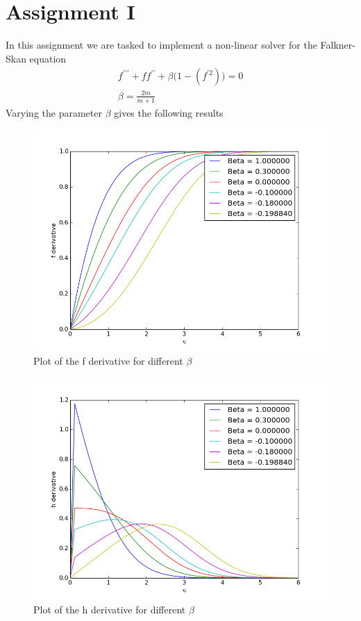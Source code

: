 \documentclass[a4paper,norsk]{article}
\begin{document}
\maketitle
\section*{Assignment I}
In this assignment we are tasked to implement a non-linear solver for the Falkner-Skan equation
\begin{align*}
f^{\prime\prime\prime} + ff^{\prime\prime} + \beta\Big(1-(f^{\prime2})\Big) = 0 \\
\beta = \frac{2m}{m+1}
\end{align*}
Varying the parameter $\beta$ gives the following results

\begin{figure}[h!]	
	\centering
	\caption*{Plot of the f derivative for different $\beta$ }
	\includegraphics[scale = 0.6]{mand1/fderi.png}
\end{figure}
\begin{figure}[h!]	
	\centering
	\caption*{Plot of the h derivative for different $\beta$}
	\includegraphics[scale = 0.6]{mand1/hderi.png}
\end{figure}
\end{document}
